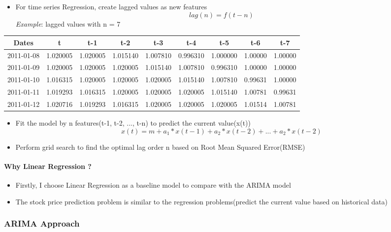 \documentclass[11pt]{article}
\providecommand{\tightlist}{%
      \setlength{\itemsep}{0pt}\setlength{\parskip}{0pt}}
\begin{document}
\begin{itemize}
\tightlist
\item
  For time series Regression, create lagged values as new features
  \[lag(n) = f(t-n) \] \emph{Example}: lagged values with n = 7
\end{itemize}

\begin{longtable}[]{@{}ccccccccc@{}}
\toprule
\textbf{Dates} & \textbf{t} & \textbf{t-1} & \textbf{t-2} & \textbf{t-3}
& \textbf{t-4} & \textbf{t-5} & \textbf{t-6} &
\textbf{t-7}\tabularnewline
\midrule
\endhead
2011-01-08 & 1.020005 & 1.020005 & 1.015140 & 1.007810 & 0.996310 &
1.000000 & 1.00000 & 1.00000\tabularnewline
2011-01-09 & 1.020005 & 1.020005 & 1.020005 & 1.015140 & 1.007810 &
0.996310 & 1.00000 & 1.00000\tabularnewline
2011-01-10 & 1.016315 & 1.020005 & 1.020005 & 1.020005 & 1.015140 &
1.007810 & 0.99631 & 1.00000\tabularnewline
2011-01-11 & 1.019293 & 1.016315 & 1.020005 & 1.020005 & 1.020005 &
1.015140 & 1.00781 & 0.99631\tabularnewline
2011-01-12 & 1.020716 & 1.019293 & 1.016315 & 1.020005 & 1.020005 &
1.020005 & 1.01514 & 1.00781\tabularnewline
\bottomrule
\end{longtable}

\begin{itemize}
\tightlist
\item
  Fit the model by n features(t-1, t-2, ..., t-n) to predict the current
  value(x(t)) \[x(t) = m + a_1*x(t-1) + a_2*x(t-2) + ... + a_2*x(t-2)\]
\item
  Perform grid search to find the optimal lag order n based on Root Mean
  Squared Error(RMSE)
\end{itemize}

\paragraph{Why Linear Regression ?}\label{why-linear-regression}

\begin{itemize}
\tightlist
\item
  Firstly, I choose Linear Regression as a baseline model to compare
  with the ARIMA model
\item
  The stock price prediction problem is similar to the regression
  problems(predict the current value based on historical data)
\end{itemize}

\subsubsection{ARIMA Approach}\label{arima-approach}
\end{document}
